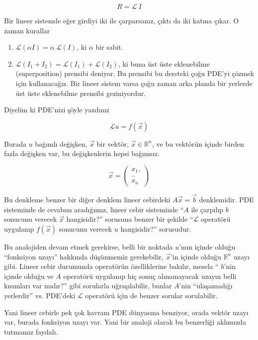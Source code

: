 \documentclass[12pt,fleqn]{article}\usepackage{../../common}
\begin{document}
$$ R = \mathcal{L} \ I $$

Bir lineer sistemde eğer girdiyi iki ile çarparsanız, çıktı da iki katına
çıkar. O zaman kurallar

\begin{enumerate}

   \item $\mathcal{L}(\alpha I) = \alpha \ \mathcal{L}(I)$, ki $\alpha$ bir sabit.

   \item $\mathcal{L}(I_1 + I_2) = \mathcal{L}(I_1) + \mathcal{L}(I_2)$, ki
     buna üst üste eklenebilme (superposition) prensibi deniyor. Bu
     prensibi bu dersteki çoğu PDE'yi çözmek için kullanacağız. Bir lineer
     sistem varsa çoğu zaman arka planda bir yerlerde üst üste eklenebilme
     prensibi geziniyordur.

\end{enumerate}

Diyelim ki PDE'nizi şöyle yazdınız

$$\mathcal{L}u = f(\vec{x}) $$

Burada $u$ bağımlı değişken, $\vec{x}$ bir vektör, $\vec{x} \in \mathbb{R} ^n$, ve
bu vektörün içinde birden fazla değişken var, bu değişkenlerin hepsi
bağımsız.

$$ 
\vec{x} = 
\left(\begin{array}{r}
x_1,\\
.. \\
x_n
\end{array}\right)
 $$

Bu denkleme benzer bir diğer denklem lineer cebirdeki $A\vec{x} = \vec{b}$
denklemidir.  PDE sisteminde de cevabını aradığımız, lineer cebir
sisteminde ``$A$ ile çarpılıp $b$ sonucunu verecek $\vec{x}$ hangisidir?''
sorusuna benzer bir şekilde ``$\mathcal{L}$ operatörü uygulanıp $f(\vec{x})$
sonucunu verecek $u$ hangisidir?'' sorusudur.

Bu analojiden devam etmek gerekirse, belli bir noktada $u$'nun içinde
olduğu ``fonksiyon uzayı'' hakkında düşünmemiz gerekebilir, $\vec{x}$'in
içinde olduğu $\mathbb{R}^n$ uzayı gibi. Lineer cebir durumunda operatörün
özelliklerine bakılır, mesela `` $b$'nin içinde olduğu ve $A$ operatörü
uygulanıp hiç sonuç alınamayacak uzayın belli kısımları var
mıdır?'' gibi sorularla uğraşılabilir, bunlar $A$'nin ``ulaşamadığı
yerlerdir'' vs. PDE'deki $\mathcal{L}$ operatörü için de benzer sorular sorulabilir. 

Yani lineer cebirle pek çok kavram PDE dünyasına benziyor, orada vektör
uzayı var, burada fonksiyon uzayı var. Yani bir analoji olarak bu
benzerliği aklımızda tutmamız faydalı. 
\end{document}
